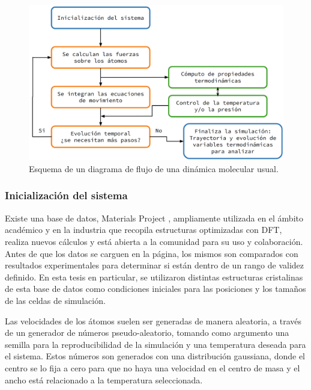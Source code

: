 \begin{figure}
    \centering
    \includegraphics[width=\textwidth]{Metodos/atomicos/esquema.png}
    \caption{Esquema de un diagrama de flujo de una dinámica molecular usual.}
    \label{fig:esquema_md}
\end{figure}


\subsubsection{Inicialización del sistema}

Existe una base de datos, Materials Project \cite{materials_project}, 
ampliamente utilizada en el ámbito académico y en la industria que 
recopila estructuras optimizadas con DFT, realiza nuevos cálculos y 
está abierta a la comunidad para su uso y colaboración. Antes de que 
los datos se carguen en la página, los mismos son comparados con resultados 
experimentales para determinar si están dentro de un rango de validez definido. 
En esta tesis en particular, se utilizaron distintas estructuras cristalinas de 
esta base de datos como condiciones iniciales para las posiciones y los tamaños 
de las celdas de simulación.

Las velocidades de los átomos suelen ser generadas de manera aleatoria, a través
de un generador de números pseudo-aleatorio, tomando como argumento una semilla 
para la reproducibilidad de la simulación y una temperatura deseada para el
sistema. Estos números son generados con una distribución gaussiana, donde el 
centro se lo fija a cero para que no haya una velocidad en el centro de masa y 
el ancho está relacionado a la temperatura seleccionada.

